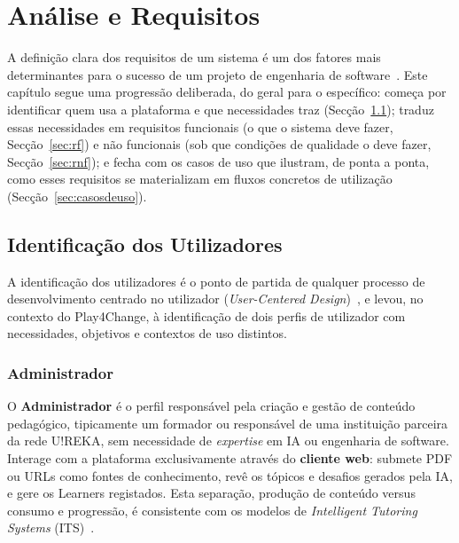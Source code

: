 %
%
\chapter{Análise e Requisitos} \label{cap:requisitos}

A definição clara dos requisitos de um sistema é um dos fatores mais determinantes para o sucesso de um projeto de engenharia de software~\cite{sommerville2016}.
Este capítulo segue uma progressão deliberada, do geral para o específico: começa por identificar quem usa a plataforma e que necessidades traz (Secção~\ref{sec:utilizadores}); traduz essas necessidades em requisitos funcionais (o que o sistema deve fazer, Secção~\ref{sec:rf}) e não funcionais (sob que condições de qualidade o deve fazer, Secção~\ref{sec:rnf}); e fecha com os casos de uso que ilustram, de ponta a ponta, como esses requisitos se materializam em fluxos concretos de utilização (Secção~\ref{sec:casosdeuso}).

\section{Identificação dos Utilizadores} \label{sec:utilizadores}

A identificação dos utilizadores é o ponto de partida de qualquer processo de desenvolvimento centrado no utilizador (\textit{User-Centered Design})~\cite{norman1988}, e levou, no contexto do Play4Change, à identificação de dois perfis de utilizador com necessidades, objetivos e contextos de uso distintos.

\subsection{Administrador}

O \textbf{Administrador} é o perfil responsável pela criação e gestão de conteúdo pedagógico, tipicamente um formador ou responsável de uma instituição parceira da rede U!REKA, sem necessidade de \textit{expertise} em IA ou engenharia de software. Interage com a plataforma exclusivamente através do \textbf{cliente web}: submete PDF ou URLs como fontes de conhecimento, revê os tópicos e desafios gerados pela IA, e gere os Learners registados. Esta separação, produção de conteúdo versus consumo e progressão, é consistente com os modelos de \textit{Intelligent Tutoring Systems} (ITS)~\cite{anderson1985}.

